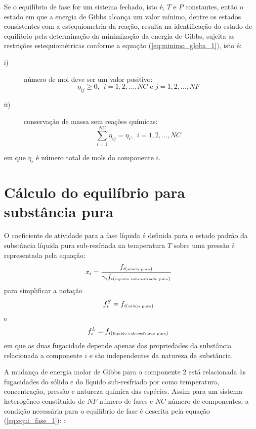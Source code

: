 Se o equilíbrio de fase for um sistema fechado, isto é,  $T$ e $P$ constantes, então o estado em que a energia de Gibbs alcança um valor mínimo, dentre os estados consistentes com a estequiometria da reação, resulta na identificação do estado de equilíbrio pela determinação da minimização da energia de Gibbs, sujeita as restrições estequiométricas conforme a equação (\ref{eq:minimo_globa_1}), isto é:
	\begin{description}
		\item[i)] número de mol deve ser um valor positivo:
		\begin{equation}
		\eta_{ij}\geqslant 0,\  \ i=1,2,\ldots,NC \mbox{ e } j=1,2,\ldots,NF
		\end{equation}
		\item[ii)] conservação de massa sem reações químicas:
		\begin{equation}
		\sum_{i=1}^{NC}\eta_{ij}=\eta_{i},\  \ i=1,2,\ldots,NC
		\end{equation}
	\end{description}
	em que $\eta_{i}$ é número total de mols do componente $i$.
	\cite{Sandlel,Barbosa2012,Prausnitz}
	
	\section{Cálculo do equilíbrio para substância pura}
	
	\hspace{5mm} O coeficiente de atividade para a fase líquida é definida para o estado padrão da substância líquida pura sub-resfriada na temperatura $T$ sobre uma pressão é representada pela equação:
	\begin{equation}\label{eq:atividade_1}x_i=\frac{f_{i(\mbox{\tiny sólido puro})}}{\gamma_{i}f_{i(\mbox{\tiny líquido sub-resfriado puro})}}
	\end{equation}
	para simplificar a notação
	\begin{equation*}
	f_{i}^{S}=f_{i(\mbox{\tiny sólido puro})}
	\end{equation*}
	e
	\begin{equation*}
	f_{i}^{L}=f_{i(\mbox{\tiny líquido sub-resfriado puro})}
	\end{equation*}
	em que as duas fugacidade depende apenas das propriedades da substância relacionada a componente $i$ e são independentes da natureza da substância. %
	
A mudança de energia molar de Gibbs para o componente 2 está relacionada às fugacidades do sólido e do líquido sub-resfriado por como temperatura, concentração, pressão e natureza química das espécies. Assim para um sistema heterogêneo constituído de $NF$ número de fases e $NC$ número de componentes, a condição necessária para o equilíbrio de fase é descrita pela equação (\ref{eq:equi_fase_1}): \cite{Rocha2011,Sandlel,Barbosa2012,Prausnitz}:

